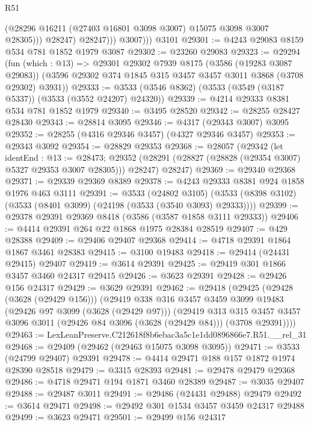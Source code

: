 \begin{lexlean}{R51}
\begin{coremodule}
                    (@28296 @16211 (@27403 @16801 @3098 @3007) @15075 @3098 @3007 @28305)))
                @28247)
              @28247)))
          @3007)))
    @3101
@29301 := @4243 @29083 @8159 @534 @781 @1852 @1979 @3087
@29302 := @23260 @29083
@29323 := @29294
    (fun (which : @13) =>
    @29301
      @29302
      @7939
      @8175
      (@3586 (@19283 @3087 @29083))
      (@3596 @29302 @374 @1845 @315 @3457 @3457 @3011 @3868 (@3708 @29302) @3931))
@29333 := @3533 (@3546 @8362) (@3533 (@3549 (@3187 @5337)) (@3533 (@3552 @24207) @24320))
@29339 := @4214 @29333 @8381 @534 @781 @1852 @1979
@29340 := @3495 @28520
@29342 := @28255 @28427 @28430
@29343 := @28814 @3095
@29346 := @4317 (@29343 @3007) @3095
@29352 := @28255 (@4316 @29346 @3457) (@4327 @29346 @3457)
@29353 := @29343 @3092
@29354 := @28829 @29353
@29368 := @28057
    (@29342
      (let identEnd : @13 := @28473;
      @29352 (@28291 (@28827 (@28828 (@29354 @3007) @5327 @29353 @3007 @28305))) @28247)
      @28247)
@29369 := @29340 @29368
@29371 := @29339 @29369 @8389
@29378 := @4243 @29333 @8381 @924 @1858 @1976 @463 @3111
@29391 := @3533
    (@24802 @3105)
    (@3533 (@8398 @3102) (@3533 (@8401 @3099) (@24198 (@3533 (@3540 @3093) @29333))))
@29399 := @29378 @29391 @29369 @8418 (@3586 (@3587 @1858 @3111 @29333))
@29406 := @4414 @29391 @264 @22 @1868 @1975 @28384 @28519
@29407 := @429 @28388
@29409 := @29406 @29407 @29368
@29414 := @4718 @29391 @1864 @1867 @3461 @28383
@29415 := @3100 @19483
@29418 := @29414 (@24431 @29415) @29407
@29419 := @3614 @29391
@29425 := @29419 @301 @1866 @3457 @3460 @24317 @29415
@29426 := @3623 @29391
@29428 := @29426 @156 @24317
@29429 := @3629 @29391
@29462 := @29418
    (@29425
      (@29428 (@3628 (@29429 @156)))
      (@29419
        @338
        @316
        @3457
        @3459
        @3099
        @19483
        (@29426 @97 @3099 (@3628 (@29429 @97)))
        (@29419
          @313
          @315
          @3457
          @3457
          @3096
          @3011
          (@29426 @84 @3096 (@3628 (@29429 @84)))
          (@3708 @29391))))
@29463 := LexLeanPreserve.C212618f8b6ebac3a5c1e1dd0896866e7.R51.__rel_31
@29468 := @29409 (@29462 (@29463 @15075 @3098 @3095))
@29471 := @3533 (@24799 @29407) @29391
@29478 := @4414 @29471 @188 @157 @1872 @1974 @28390 @28518
@29479 := @3315 @28393
@29481 := @29478 @29479 @29368
@29486 := @4718 @29471 @194 @1871 @3460 @28389
@29487 := @3035 @29407
@29488 := @29487 @3011
@29491 := @29486 (@24431 @29488) @29479
@29492 := @3614 @29471
@29498 := @29492 @301 @1534 @3457 @3459 @24317 @29488
@29499 := @3623 @29471
@29501 := @29499 @156 @24317

\end{coremodule}
\end{lexlean}
